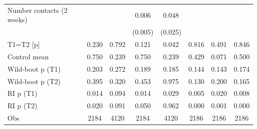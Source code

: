 {\begin{tabular}{l*{7}{c}}
Number contacts (2 weeks)&                     &                     &       0.006         &       0.048         &                     &                     &                     \\
                    &                     &                     &     (0.005)         &     (0.025)         &                     &                     &                     \\
\midrule
T1=T2 [p]           &       0.230         &       0.792         &       0.121         &       0.042         &       0.816         &       0.491         &       0.846         \\
Control mean        &       0.750         &       0.239         &       0.750         &       0.239         &       0.429         &       0.071         &       0.500         \\
Wild-boot p (T1)    &       0.203         &       0.272         &       0.189         &       0.185         &       0.144         &       0.143         &       0.174         \\
Wild-boot p (T2)    &       0.395         &       0.320         &       0.453         &       0.975         &       0.130         &       0.200         &       0.165         \\
RI p (T1)           &       0.014         &       0.094         &       0.014         &       0.029         &       0.005         &       0.020         &       0.008         \\
RI p (T2)           &       0.020         &       0.091         &       0.050         &       0.962         &       0.000         &       0.001         &       0.000         \\
Obs                 &        2184         &        4120         &        2184         &        4120         &        2186         &        2186         &        2186         \\
\bottomrule
\end{tabular}
}
